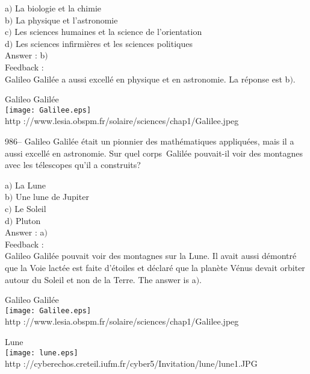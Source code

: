 \documentclass[letterpaper, 12pt]{article}
\begin{document}
a$)$ La biologie et la chimie \\
b$)$ La physique et l'astronomie \\
c$)$ Les sciences humaines et la science de l'orientation \\
d$)$ Les sciences infirmi\`eres et les sciences politiques\\

Answer : b$)$\\

Feedback : \\
Galileo Galil\'ee a aussi excell\'e en physique et en astronomie. La
r\'eponse est b$)$.

        \begin{center}
        Galileo Galil\'ee\\
    \texttt{[image: Galilee.eps]}\\
        {\footnotesize http
://www.lesia.obspm.fr/solaire/sciences/chap1/Galilee.jpeg}
    \end{center}

986-- Galileo Galil\'ee \'etait un pionnier des math\'ematiques
appliqu\'ees, mais il a aussi excell\'e en astronomie. Sur quel \og
corps\fg\ Galil\'ee pouvait-il voir des montagnes avec les
t\'elescopes qu'il a construits?

a$)$ La Lune \\
b$)$ Une lune de Jupiter \\
c$)$ Le Soleil \\
d$)$ Pluton\\

Answer : a$)$\\

Feedback : \\
Galileo Galil\'ee pouvait voir des montagnes sur la Lune. Il avait
aussi d\'emontr\'e que la Voie lact\'ee est faite d'\'etoiles et
d\'eclar\'e que la plan\`ete V\'enus devait orbiter autour du Soleil
et non de la Terre.
The answer is a$)$.\\

        \begin{center}
        Galileo Galil\'ee\\
    \texttt{[image: Galilee.eps]}\\
        {\footnotesize http
://www.lesia.obspm.fr/solaire/sciences/chap1/Galilee.jpeg}
    \end{center}

        \begin{center}
        Lune\\
    \texttt{[image: lune.eps]}\\
        {\footnotesize http
://cyberechos.creteil.iufm.fr/cyber5/Invitation/lune/lune1.JPG}
    \end{center}
\end{document}
